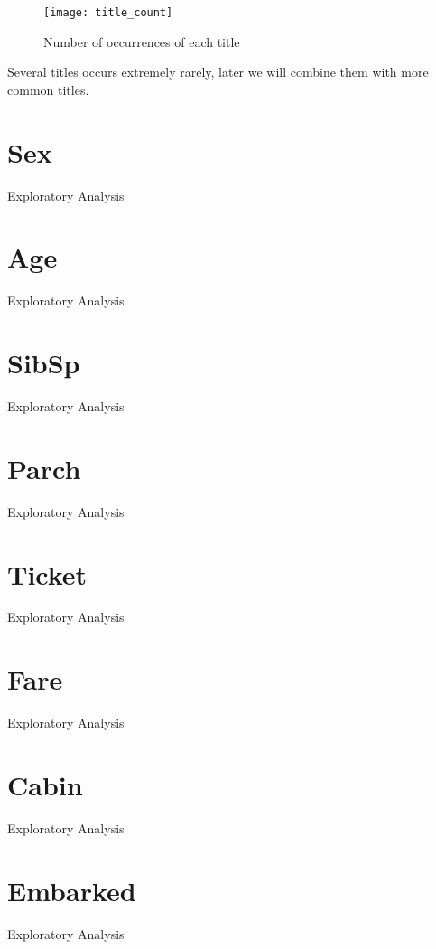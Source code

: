 \begin{figure}[!ht]
    \centering
    \texttt{[image: title\_count]}
    \caption{Number of occurrences of each title}
    \label{pic:title_count}
\end{figure}

Several titles occurs extremely rarely, later we will combine them with 
more common titles.


\section{Sex} \label{section:Sex}
Exploratory Analysis


\section{Age} \label{section:Age}
Exploratory Analysis


\section{SibSp} \label{section:SibSp}
Exploratory Analysis


\section{Parch} \label{section:Parch}
Exploratory Analysis


\section{Ticket} \label{section:Ticket}
Exploratory Analysis


\section{Fare} \label{section:Fare}
Exploratory Analysis


\section{Cabin} \label{section:Cabin}
Exploratory Analysis


\section{Embarked} \label{section:Embarked}
Exploratory Analysis